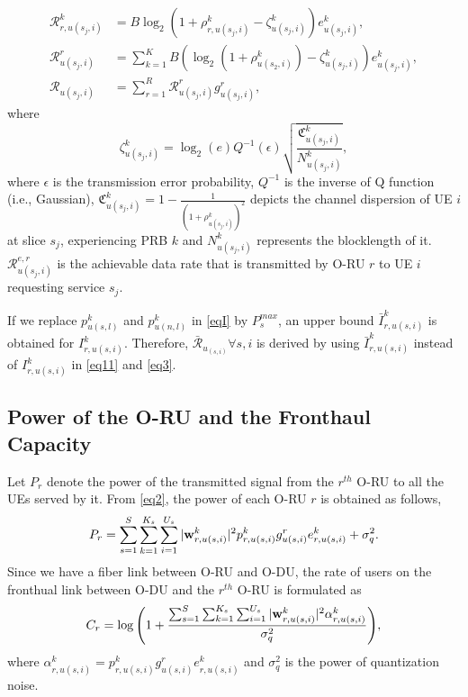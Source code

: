 \documentclass[lettersize,journal]{IEEEtran}
\begin{document}
\begin{subequations}\label{eq11}
\begin{alignat}{4}
\mathcal{{R}}_{r,u(s_j,i)}^{k} &= B \log_2({1+ \rho_{r,u(s_j,i)}^{k}} - \zeta_{u(s_j,i)}^{k}){e}_{u(s_j,i)}^{k},\\
\mathcal{R}_{u(s_j,i)}^{r} &= \sum_{k=1}^{K} B (\log_2({1+ \rho_{u(s_2,i)}^{k}})- \zeta_{u(s_j,i)}^{k}){e}_{u(s_j,i)}^{k},\\
\mathcal{R}_{u(s_j,i)} &= \sum_{r=1}^{R}\mathcal{R}_{u(s_j,i)}^{r} g^r_{u(s_j,i)},
\end{alignat}
\end{subequations}
where %
\begin{equation}\label{shortPacket}
 \zeta_{u(s_j,i)}^{k} = \log_2({e})Q^{-1}(\epsilon) \sqrt{\frac{\mathfrak{C}_{u(s_j,i)}^{k}}{N_{u(s_j,i)}^{k}}},
\end{equation}
where $\epsilon$ is the transmission error probability, $Q^{-1}$ is the inverse of Q function (i.e., Gaussian),
$\mathfrak{C}_{u(s_j,i)}^{k} = 1 - \frac{1}{(1+\rho_{u(s_j,i)}^{k})^2}$ depicts the channel dispersion of UE  $i$ at slice $s_j$, experiencing PRB $k$ and
$N_{u(s_j,i)}^{k}$ represents the blocklength of it.
$\mathcal{R}_{u(s_j,i)}^{e,r}$ is the achievable data rate that is transmitted by O-RU $r$ to UE $i$ requesting service $s_j$.

If we replace $p_{u(s,l)}^{k}$ and $p_{u(n,l)}^{k}$ in \eqref{eqI} by $P_{s}^{max}$, an upper bound $\bar{I}_{r,u(s,i)}^{k}$ is obtained for $I_{r,u(s,i)}^{k}$. Therefore, $\bar{\mathcal{R}}_{u_{(s,i)}} \forall s , i$ is derived by using $\bar{I}_{r,u(s,i)}^{k}$ instead of $I_{r,u(s,i)}^{k}$ in  \eqref{eq11} and \eqref{eq3}.
\subsection{Power of the O-RU and the Fronthaul Capacity}
Let $P_r$ denote the power of the transmitted signal from the $r^{th}$ O-RU to all the UEs served by it. From \eqref{eq2}, the power of each O-RU $r$ is obtained as follows,
\begin{equation}\label{pr}
P_r = \sum_{s=1}^{S}\sum_{k=1}^{K_s}\sum_{i=1}^{U_s}|\bold{w}_{r,u(s,i)}^{k}|^2 p_{r,u(s,i)}^{k} g_{u(s,i)}^r e^k_{r,u(s,i)}+ \sigma_{q}^2.
\end{equation}
Since we have a fiber link between O-RU and O-DU, the rate of users on the fronthual link between O-DU and the $r^{th}$ O-RU  is formulated as
\begin{equation}\label{cr}
C_{r} = \log{\left(1+ \frac{\sum_{s=1}^{S}\sum_{k=1}^{K_s}\sum_{i=1}^{U_s}|\bold{w}_{r,u(s,i)}^{k}|^2 \mathcal{\alpha}^k_{r,u(s,i)} }{ \sigma_{q}^2}\right)},
\end{equation}
where $\mathcal{\alpha}^k_{r,u(s,i)}= p_{r,u(s,i)}^{k} g_{u(s,i)}^r e^k_{r,u(s,i)}$ and $\sigma_{q}^2$ is the power of quantization noise.
\end{document}
